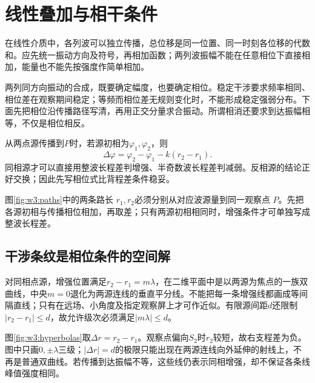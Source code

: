 \section{线性叠加与相干条件}
在线性介质中，各列波可以独立传播，总位移是同一位置、同一时刻各位移的代数和。应先统一振动方向及符号，再相加函数；两列波振幅不能在任意相位下直接相加，能量也不能先按强度作简单相加。

两列同方向振动的合成，既要确定幅度，也要确定相位。稳定干涉要求频率相同、相位差在观察期间稳定；等频而相位差无规则变化时，不能形成稳定强弱分布。下面先把相位沿传播路径写清，再用正交分量求合振动。所谓相消还要求到达振幅相等，不仅是相位相反。

从两点源传播到$P$时，若源初相为$\varphi_1,\varphi_2$，则
\[
\Delta\varphi=\varphi_2-\varphi_1-k(r_2-r_1).
\]
同相源才可以直接用整波长程差判增强、半奇数波长程差判减弱。反相源的结论正好交换；因此先写相位式比背程差条件稳妥。


图\ref{fig:w3:paths}中的两条路长 $r_1,r_2$必须分别从对应波源量到同一观察点 $P$。先把各源初相与传播相位相加，再取差；只有两源初相相同时，增强条件才可单独写成整波长程差。

\subsection{干涉条纹是相位条件的空间解}
对同相点源，增强位置满足$r_2-r_1=m\lambda$，在二维平面中是以两源为焦点的一族双曲线，中央$m=0$退化为两源连线的垂直平分线。不能把每一条增强线都画成等间隔直线；只有在远场、小角度及指定观察屏上才可作近似。有限源间距$d$还限制$|r_2-r_1|\le d$，故允许级次必须满足$|m\lambda|\le d$。

图\ref{fig:w3:hyperbolas}取$\Delta r=r_2-r_1$。观察点偏向$S_2$时$r_2$较短，故右支程差为负。图中只画$0,\pm\lambda$三级；$|\Delta r|=d$的极限只能出现在两源连线向外延伸的射线上，不再是普通双曲线。若传播到达振幅不等，这些线仍表示同相增强，却不保证各条线峰值强度相同。


